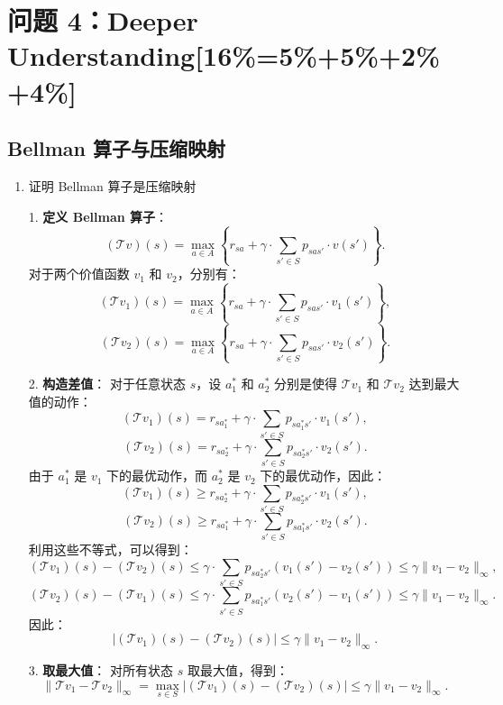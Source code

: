 \documentclass{article}
\begin{document}
\section{问题 4：Deeper Understanding[16\%=5\%+5\%+2\%+4\%]}
\subsection{Bellman 算子与压缩映射}
\begin{enumerate}[label=(\alph*), start=1]
    
    \item 证明 Bellman 算子是压缩映射
    
    1. \textbf{定义 Bellman 算子}：
    \[
    (\mathcal{T}v)(s) = \max_{a \in A} \left\{ r_{sa} + \gamma \cdot \sum_{s' \in S} p_{sas'} \cdot v(s') \right\}.
    \]
    对于两个价值函数 \(v_1\) 和 \(v_2\)，分别有：
    \[
    (\mathcal{T}v_1)(s) = \max_{a \in A} \left\{ r_{sa} + \gamma \cdot \sum_{s' \in S} p_{sas'} \cdot v_1(s') \right\},
    \]
    \[
    (\mathcal{T}v_2)(s) = \max_{a \in A} \left\{ r_{sa} + \gamma \cdot \sum_{s' \in S} p_{sas'} \cdot v_2(s') \right\}.
    \]
    
    2. \textbf{构造差值}：
    对于任意状态 \(s\)，设 \(a_1^*\) 和 \(a_2^*\) 分别是使得 \(\mathcal{T}v_1\) 和 \(\mathcal{T}v_2\) 达到最大值的动作：
    \[
    (\mathcal{T}v_1)(s) = r_{sa_1^*} + \gamma \cdot \sum_{s' \in S} p_{sa_1^*s'} \cdot v_1(s'),
    \]
    \[
    (\mathcal{T}v_2)(s) = r_{sa_2^*} + \gamma \cdot \sum_{s' \in S} p_{sa_2^*s'} \cdot v_2(s').
    \]
    由于 \(a_1^*\) 是 \(v_1\) 下的最优动作，而 \(a_2^*\) 是 \(v_2\) 下的最优动作，因此：
    \[
    (\mathcal{T}v_1)(s) \geq r_{sa_2^*} + \gamma \cdot \sum_{s' \in S} p_{sa_2^*s'} \cdot v_1(s'),
    \]
    \[
    (\mathcal{T}v_2)(s) \geq r_{sa_1^*} + \gamma \cdot \sum_{s' \in S} p_{sa_1^*s'} \cdot v_2(s').
    \]
    利用这些不等式，可以得到：
    \[
    (\mathcal{T}v_1)(s) - (\mathcal{T}v_2)(s) \leq \gamma \cdot \sum_{s' \in S} p_{sa_2^*s'} (v_1(s') - v_2(s')) \leq \gamma \|v_1 - v_2\|_\infty,
    \]
    \[
    (\mathcal{T}v_2)(s) - (\mathcal{T}v_1)(s) \leq \gamma \cdot \sum_{s' \in S} p_{sa_1^*s'} (v_2(s') - v_1(s')) \leq \gamma \|v_1 - v_2\|_\infty.
    \]
    因此：
    \[
    |(\mathcal{T}v_1)(s) - (\mathcal{T}v_2)(s)| \leq \gamma \|v_1 - v_2\|_\infty.
    \]
    
    3. \textbf{取最大值}：
    对所有状态 \(s\) 取最大值，得到：
    \[
    \|\mathcal{T}v_1 - \mathcal{T}v_2\|_\infty = \max_{s \in S} |(\mathcal{T}v_1)(s) - (\mathcal{T}v_2)(s)| \leq \gamma \|v_1 - v_2\|_\infty.
    \]
    

\end{enumerate}
\end{document}
